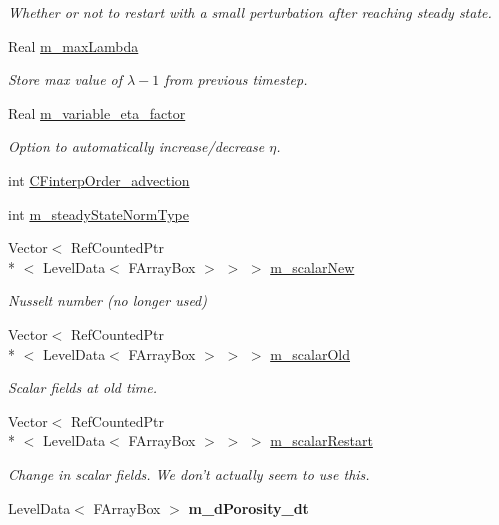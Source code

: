 \begin{DoxyCompactItemize}
\begin{DoxyCompactList}\small\item\em Whether or not to restart with a small perturbation after reaching steady state. \end{DoxyCompactList}\item 
Real \hyperlink{class_a_m_r_level_mushy_layer_a49000dfb8d30dc44b35fc1c802c9fd4c}{m\-\_\-max\-Lambda}
\begin{DoxyCompactList}\small\item\em Store max value of $ \lambda-1 $ from previous timestep. \end{DoxyCompactList}\item 
Real \hyperlink{class_a_m_r_level_mushy_layer_ae2655a0f1abc12048154f60bfca18110}{m\-\_\-variable\-\_\-eta\-\_\-factor}
\begin{DoxyCompactList}\small\item\em Option to automatically increase/decrease $ \eta $. \end{DoxyCompactList}\item 
int \hyperlink{class_a_m_r_level_mushy_layer_afcdd508c570b393a964397f344bfd4a1}{C\-Finterp\-Order\-\_\-advection}
\item 
int \hyperlink{class_a_m_r_level_mushy_layer_ac4fc74a2eaea0389f94d8e36513b8773}{m\-\_\-steady\-State\-Norm\-Type}
\item 
Vector$<$ Ref\-Counted\-Ptr\\*
$<$ Level\-Data$<$ F\-Array\-Box $>$ $>$ $>$ \hyperlink{class_a_m_r_level_mushy_layer_a4937b8d2fdcfb86d57b7f197f91f5069}{m\-\_\-scalar\-New}
\begin{DoxyCompactList}\small\item\em Nusselt number (no longer used) \end{DoxyCompactList}\item 
\hypertarget{class_a_m_r_level_mushy_layer_ac46148c3e276d617167713088ffe0599}{Vector$<$ Ref\-Counted\-Ptr\\*
$<$ Level\-Data$<$ F\-Array\-Box $>$ $>$ $>$ \hyperlink{class_a_m_r_level_mushy_layer_ac46148c3e276d617167713088ffe0599}{m\-\_\-scalar\-Old}}\label{class_a_m_r_level_mushy_layer_ac46148c3e276d617167713088ffe0599}

\begin{DoxyCompactList}\small\item\em Scalar fields at old time. \end{DoxyCompactList}\item 
Vector$<$ Ref\-Counted\-Ptr\\*
$<$ Level\-Data$<$ F\-Array\-Box $>$ $>$ $>$ \hyperlink{class_a_m_r_level_mushy_layer_a05741bcf973b908f3defe7aa3de6dcc8}{m\-\_\-scalar\-Restart}
\begin{DoxyCompactList}\small\item\em Change in scalar fields. We don't actually seem to use this. \end{DoxyCompactList}\item 
\hypertarget{class_a_m_r_level_mushy_layer_a29bc16b92f683fa1006932cdc417b9f5}{Level\-Data$<$ F\-Array\-Box $>$ {\bfseries m\-\_\-d\-Porosity\-\_\-dt}}\label{class_a_m_r_level_mushy_layer_a29bc16b92f683fa1006932cdc417b9f5}


\end{DoxyCompactItemize}
